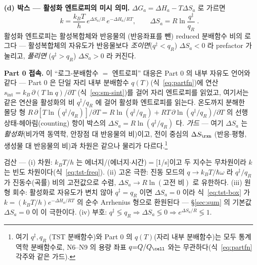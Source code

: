 \begin{bgbox}
\textbf{(d) 박스 --- 활성화 엔트로피의 미시 의미.} $\Delta G_a=\Delta H_a-T\Delta S_a$ 로 가르면
\begin{equation}
\boxed{\;k=\frac{k_BT}{h}\,e^{\Delta S_a/R}\,e^{-\Delta H_a/RT},
\qquad \Delta S_a=R\ln\frac{q^{\ddagger}}{q_R}\;.}
\label{eq:tst-box}
\end{equation}
활성화 엔트로피는 활성복합체와 반응물의 (반응좌표를 뺀) reduced 분배함수 비의 로그다 --- 활성복합체의
자유도가 반응물보다 \emph{조이면}($q^{\ddagger}<q_R$) $\Delta S_a<0$ 라 prefactor 가 눌리고, \emph{풀리면}
($q^{\ddagger}>q_R$) $\Delta S_a>0$ 라 커진다.

\textbf{Part 0 접속.} 이 ``로그-분배함수 $=$ 엔트로피'' 대응은 Part 0 의 내부 자유도 언어와 같다 --- Part 0 은
단일 자리 내부 분배함수 $q(T)$(식~\eqref{eq:partfn})에 연산 $s_\mathrm{int}=k_B\,\partial(T\ln q)/\partial T$
(식~\eqref{eq:sm-sint})를 걸어 자리 엔트로피를 읽었고, 여기서는 같은 연산을 활성화의 비 $q^{\ddagger}/q_R$ 에
걸어 활성화 엔트로피를 읽는다. 온도까지 분해한 몰당 형
$R\,\partial[T\ln(q^{\ddagger}/q_R)]/\partial T=R\ln(q^{\ddagger}/q_R)+RT\,\partial\ln(q^{\ddagger}/q_R)/\partial T$
의 선행 상태-헤아림(counting) 항이 박스의 $\Delta S_a=R\ln(q^{\ddagger}/q_R)$ 다. \emph{가드} --- 여기
$\Delta S_a$ 는 \emph{활성화}(비가역 동역학, 안장점 대 반응물의 비)이고, 전이 중심의 $\Delta S_\rxn$
(반응$\cdot$평형, 생성물 대 반응물의 비)과 차원은 같으나 물리가 다르다.\footnote{여기 $q^{\ddagger},q_R$
(TST 분배함수)와 Part 0 의 $q(T)$(자리 내부 분배함수)는 모두 통계역학 분배함수로, N6--N9 의 용량 좌표
$q{=}Q/Q_\cell$ 와는 무관하다(식~\eqref{eq:partfn} 각주와 같은 가드).}

\begin{verifybox}
검산 --- (i) 차원: $k_BT/h$ 는 에너지/(에너지$\cdot$시간)$=$[1/s]이고 두 지수는 무차원이라 $k$ 는 빈도
차원이다(식~\eqref{eq:tst-freq}). (ii) 고온 극한: 진동 모드의 $q\to k_BT/\hbar\omega$ 라 $q^{\ddagger}/q_R$ 가
진동수(곡률) 비의 고전값으로 수렴, $\Delta S_a\to R\ln(\text{고전 비})$ 로 유한하다. (iii) 원형 회수:
활성화로 자유도가 변치 않아 $q^{\ddagger}=q_R$ 이면 $\Delta S_a=0$ 이라 식~\eqref{eq:tst-box} 가
$k=(k_BT/h)e^{-\Delta H_a/RT}$ 의 순수 Arrhenius 형으로 환원된다 --- \S\ref{sec:sum} 의 기본값
$\Delta S_a{=}0$ 이 이 극한이다. (iv) 부호: $q^{\ddagger}\lessgtr q_R\Rightarrow\Delta S_a\lessgtr0
\Rightarrow e^{\Delta S_a/R}\lessgtr1$.
\end{verifybox}
\end{bgbox}


